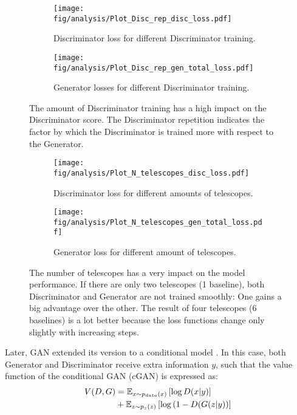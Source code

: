 \begin{figure*}
	\centering
	\begin{subfigure}{0.5\linewidth}
		\centering
		\texttt{[image: fig/analysis/Plot\_Disc\_rep\_disc\_loss.pdf]}
		\caption{Discriminator loss for different Discriminator training.}
		\label{fig:Plot_discrep_discloss}
	\end{subfigure}\hfill
	\begin{subfigure}{0.5\linewidth}
		\centering
		\texttt{[image: fig/analysis/Plot\_Disc\_rep\_gen\_total\_loss.pdf]}
		\caption{Generator losses for different Discriminator training.}
		\label{fig:Plot_discrep_genloss}
	\end{subfigure}\hfill
	\caption{The amount of Discriminator training has a high impact on the Discriminator score. The Discriminator repetition indicates the factor by which the Discriminator is trained more with respect to the Generator.}
	\label{fig:Plot_discrep_loss}
\end{figure*}
\begin{figure*}
	\centering
	\begin{subfigure}{0.5\linewidth}
		\centering
		\texttt{[image: fig/analysis/Plot\_N\_telescopes\_disc\_loss.pdf]}
		\caption{Discriminator loss for different amounts of telescopes.}
		\label{fig:Plot_telescopes_discloss}
	\end{subfigure}\hfill
	\begin{subfigure}{0.5\linewidth}
		\centering
		\texttt{[image: fig/analysis/Plot\_N\_telescopes\_gen\_total\_loss.pdf]}
		\caption{Generator loss for different amount of telescopes.}
		\label{fig:Plot_telescopes_genloss}
	\end{subfigure}\hfill
	\caption{The number of telescopes has a very impact on the model performance. If there are only two telescopes (1 baseline), both Discriminator and Generator are not trained smoothly: One gains a big advantage over the other. The result of four telescopes (6 baselines) is a lot better because the loss functions change only slightly with increasing steps.}
	\label{fig:Plot_telescopes_loss}
\end{figure*}

Later, GAN extended its version to a conditional model \cite{mirza2014conditional}. In this case, both Generator and Discriminator receive extra information $y$, such that the value function of the conditional GAN (cGAN) is expressed as:
\begin{equation}
	\centering
	\begin{aligned}
		V(D, G) &= \mathbb{E}_{x \sim p_{data}(x)} \left[ \log D(x|y) \right] \\
		&+ \mathbb{E}_{z \sim p_{z}(z)} \left[ \log \left( 1-D(G(z|y) \right) \right]
	\end{aligned}
	\label{eq:conditional_GAN}
\end{equation}

